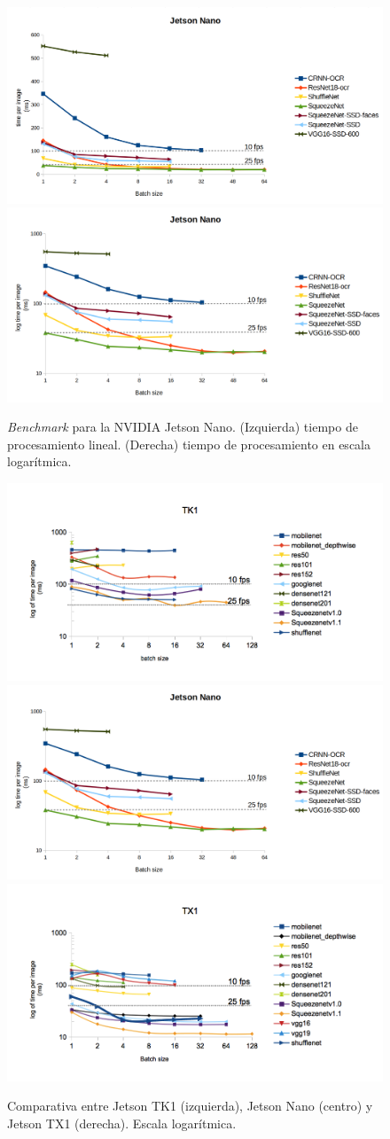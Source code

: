 \begin{figure}[htp]
    \centering
    \captionsetup{justification=centering}
    \includegraphics[width=.5\textwidth]{img/Jetson-nano-linear.png}\hfill
    \includegraphics[width=.5\textwidth]{img/Jetson-nano-log.png}
    \caption{\textit{Benchmark} para la NVIDIA Jetson Nano. (Izquierda) tiempo de procesamiento lineal. (Derecha) tiempo de procesamiento en escala logarítmica.}
    \label{fig:ben_nano}
\end{figure}

\begin{figure}[htp]
    \centering
    \captionsetup{justification=centering}
    \includegraphics[width=.33\textwidth]{img/TK1_log.png}\hfill
    \includegraphics[width=.33\textwidth]{img/Jetson-nano-log.png}\hfill
    \includegraphics[width=.33\textwidth]{img/TX1_log.png}
    \caption{Comparativa entre Jetson TK1 (izquierda), Jetson Nano (centro) y Jetson TX1 (derecha). Escala logarítmica.}
    \label{fig:ben_nano_comp}
\end{figure}

